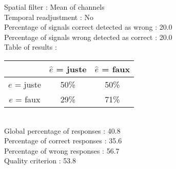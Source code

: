 Spatial filter : Mean of channels \\
Temporal readjustment : No \\
Percentage of signals correct detected as wrong :   20.0 \\
Percentage of signals wrong detected as correct :   20.0 \\
Table of results : \\
\begin{tabular}{|c|c|c|}
\hline				& $\hat{e}$ = juste & $\hat{e}$ = faux \\
\hline  $e$ = juste	&     50\%			&     50\%		\\
\hline  $e$ = faux	&     29\%			&     71\%		\\
\hline
\end{tabular}\\
Global percentage of responses :   40.8 \\
Percentage of correct responses :   35.6 \\
Percentage of wrong responses :   56.7 \\
Quality criterion :   53.8 \\

